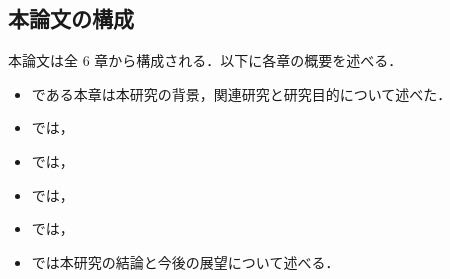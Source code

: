 \subsection{本論文の構成}
\label{sec:organization}
本論文は全 6 章から構成される．以下に各章の概要を述べる．

\begin{itemize}
  \item {}である本章は本研究の背景，関連研究と研究目的について述べた．
  \item {}では，
  \item {}では，
  \item {}では，
  \item {}では，
  \item {}では本研究の結論と今後の展望について述べる．
\end{itemize}

\newpage


\newpage